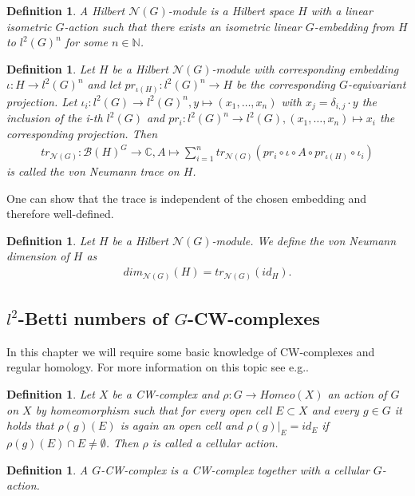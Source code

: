 \documentclass[12pt,a4paper]{scrartcl}
\newtheorem{Definition}[Theorem]{Definition}
\numberwithin{equation}{section}
\newcommand{\C}{\mathbb{C}} %
\newcommand{\N}{\mathbb{N}} %
\newcommand{\2}{\mathbb{Z} / 2 \mathbb{Z}}
\newcommand{\1}{\overline{1}}
\newcommand{\0}{\overline{0}}
\begin{document}
\begin{Definition}
	A Hilbert $\mathcal{N}(G)$-module is a Hilbert space $H$ with a linear isometric $G$-action such that there exists an isometric linear $G$-embedding from $H$ to $l^2(G)^n$ for some $n \in \N$.
\end{Definition}
\begin{Definition}
	Let $H$ be a Hilbert $\mathcal{N}(G)$-module with corresponding embedding $\iota: H \to l^2(G)^n$ and let $pr_{\iota(H)}: l^2(G)^n \to H$ be the corresponding $G$-equivariant projection. Let $\iota_i: l^2(G) \to l^2(G)^n, y \mapsto (x_1, \ldots, x_n)$ with $x_j = \delta_{i,j} \cdot y$ the inclusion of the i-th $l^2(G)$ and $pr_i: l^2(G)^n \to l^2(G), (x_1, \ldots, x_n) \mapsto x_i$ the corresponding projection. Then 
	\begin{align*}
		tr_{\mathcal{N}(G)}: \mathcal{B}(H)^G \to \C, A \mapsto \sum_{i = 1}^{n} tr_{\mathcal{N}(G)}(pr_i \circ \iota \circ A \circ pr_{\iota(H)} \circ \iota_i)
	\end{align*}
	is called the von Neumann trace on $H$.
\end{Definition}
One can show that the trace is independent of the chosen embedding and therefore well-defined.  
\begin{Definition}
	Let $H$ be a Hilbert $\mathcal{N}(G)$-module. We define the von Neumann dimension of $H$ as
	\begin{align*}
		dim_{\mathcal{N}(G)}(H) = tr_{\mathcal{N}(G)}(id_H).
	\end{align*}
\end{Definition}

\subsection{$l^2$-Betti numbers of $G$-CW-complexes}
In this chapter we will require some basic knowledge of CW-complexes and regular homology. For more information on this topic see e.g.\cite{HATCH}.
\begin{Definition}
	Let $X$ be a CW-complex and $\rho: G \to Homeo(X)$ an action of $G$ on $X$ by homeomorphism such that for every open cell $E \subset X$ and every $g \in G$ it holds that $\rho(g)(E)$ is again an open cell and $\rho(g)|_{E} = id_E$ if $\rho(g)(E) \cap E \neq \emptyset$. Then $\rho$ is called a cellular action.
\end{Definition}

\begin{Definition}
	A $G$-CW-complex is a CW-complex together with a cellular $G$-action.
\end{Definition}
\end{document}
